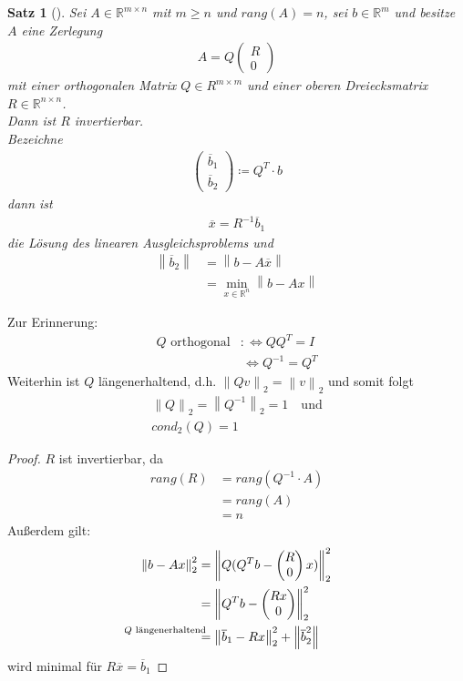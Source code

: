 \documentclass[ngerman,fontsize=11pt, paper=a4, parskip=half, titlepage=true, toc=bib]{scrbook}
\theoremstyle{definition}
\theoremstyle{plain}
\newtheorem{Satz}[Def]{Satz}		%
\newcommand{\R}{\mathds{R}}
\newcommand{\Ren}{\mathds{R}^{n}}
\newcommand{\nn}[1]{\left\| #1 \right\|}
\newcommand{\subsectione}[1]{\subsection{#1} \addtocounter{Def}{1}}
\newenvironment{Satze}[1][]{ %
	\begin{Satz}[#1]
}
{
	\end{Satz}
	\addtocounter{subsection}{1}
}
\begin{document}
  
\begin{Satze}
	Sei $A\in \R^{m\times n} $ mit $m\geq n$ und $rang(A) = n$,
	sei $b\in\R^m$ und besitze $A$ eine Zerlegung
	\begin{gather*}
	A= Q\begin{pmatrix}R\\0\end{pmatrix}
	\end{gather*}
	mit einer orthogonalen Matrix $Q\in R^{m\times m}$ und 
	einer oberen Dreiecksmatrix $R\in \R^{n\times n}$. \\
	Dann ist $R$ invertierbar. \\
	Bezeichne 
	\begin{gather}
	\begin{pmatrix} \overline{b}_1 \\ \overline{b}_2\end{pmatrix}
	\coloneqq Q^T\cdot b
	\label{IV.3.9}
	\end{gather}
	dann ist
	\begin{gather}
	\overline{x} = R^{-1} \overline{b}_1 
	\label{IV.3.10}
	\end{gather}
	die Lösung des linearen Ausgleichsproblems und
	\begin{align*}
	\nn{\overline{b}_2} &= \nn{b-A\overline{x}} \\
	& = \min_{x\in \Ren }\nn{b-Ax}
	\end{align*}
 \end{Satze}

	Zur Erinnerung:
	\begin{align*}
	Q \text{ orthogonal} &:\Leftrightarrow QQ^T = I \\
	&\, \Leftrightarrow Q^{-1} = Q^T
	\end{align*}
	Weiterhin ist $Q$ längenerhaltend, d.h. $\nn{Qv}_2 = \nn{v}_2$ 
	und somit folgt
	\begin{gather}
	\nonumber
	\nn{Q}_2 = \nn{Q^{-1}}_2 = 1 \quad \text{und} \\
	cond_2(Q) = 1
	\label{IV.3.11}
	\end{gather}
	
	\begin{proof} $R$ ist invertierbar, da 
		\begin{align*}
		rang(R) &= rang(Q^{-1}\cdot A) \\	
		& = rang(A) \\
		&= n
		\end{align*}
		Außerdem gilt:
		\begin{align*}
		\nn{b-Ax}_2^2 & = \nn{Q(Q^Tb-\begin{pmatrix}R\\0\end{pmatrix}x)}_2^2 \\
		&=  \nn{Q^Tb-\begin{pmatrix}Rx\\0\end{pmatrix}}_2^2  \\
		&\overset{\mathllap{\text{$Q$ längenerhaltend}}}{=}
		\nn{\overline{b}_1 - Rx}_2^2  + \nn{\overline{b}_2^2}
		\end{align*}
		wird minimal für $R\overline{x} = \overline{b}_1$
	\end{proof}
  
\end{document}
